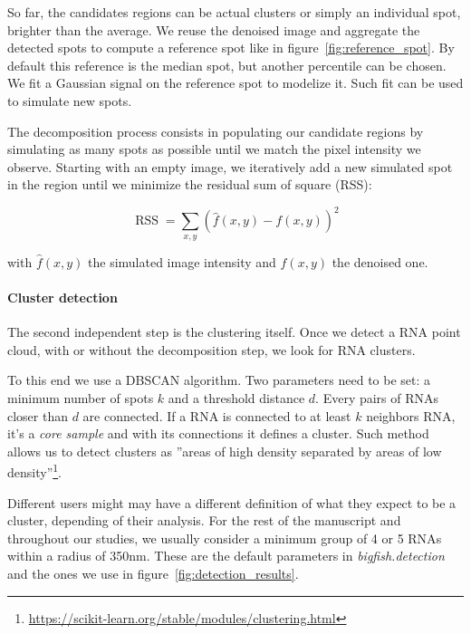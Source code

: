 So far, the candidates regions can be actual clusters or simply an individual spot, brighter than the average.
We reuse the denoised image and aggregate the detected spots to compute a reference spot like in figure~\ref{fig:reference_spot}.
By default this reference is the median spot, but another percentile can be chosen.
We fit a Gaussian signal on the reference spot to modelize it.
Such fit can be used to simulate new spots.

The decomposition process consists in populating our candidate regions by simulating as many spots as possible until we match the pixel intensity we observe.
Starting with an empty image, we iteratively add a new simulated spot in the region until we minimize the residual sum of square (RSS):

\begin{equation}
	{\displaystyle \operatorname {RSS} =\sum _{x, y}(\hat{f}(x, y) - f(x, y))^{2}}
\end{equation}

\noindent
with $\hat{f}(x, y)$ the simulated image intensity and $f(x, y)$ the denoised one.

\paragraph{Cluster detection}

The second independent step is the clustering itself.
Once we detect a \ac{RNA} point cloud, with or without the decomposition step, we look for \ac{RNA} clusters.

To this end we use a DBSCAN algorithm\cite{ester_density-based_1996, scikit-learn}.
Two parameters need to be set: a minimum number of spots $k$ and a threshold distance $d$.
Every pairs of \ac{RNA}s closer than $d$ are connected.
If a \ac{RNA} is connected to at least $k$ neighbors \ac{RNA}, it's a \emph{core sample} and with its connections it defines a cluster.
Such method allows us to detect clusters as ''areas of high density separated by areas of low density''\footnote{\url{https://scikit-learn.org/stable/modules/clustering.html}}.

Different users might may have a different definition of what they expect to be a cluster, depending of their analysis.
For the rest of the manuscript and throughout our studies, we usually consider a minimum group of 4 or 5 \ac{RNA}s within a radius of 350nm.
These are the default parameters in \emph{bigfish.detection} and the ones we use in figure~\ref{fig:detection_results}.\\

